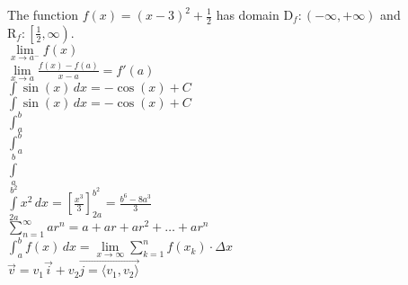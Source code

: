 \documentclass[11pt,letterpaper]{article}
\begin{document}
  The function $f(x) = (x-3)^2+\frac{1}{2}$ has domain $\mathrm{D}_f :(-\infty, +\infty)$ and $\mathrm{R}_f : \left[\frac{1}{2}, \infty\right)$.\\
  
  $\lim \limits_{x \to a^-} f(x)$\\
  
  $\displaystyle{\lim \limits_{x \to a} \frac{f(x)-f(a)}{x-a} = f'(a)}$\\
  
  $\int \sin(x) \, dx = -\cos(x) + C$\\
  
  $\displaystyle{\int \sin(x) \, dx = -\cos(x) + C}$\\

  $\int_a^b$\\
  
  $\displaystyle{\int_a^b}$\\
  
  $\int \limits_a^b$\\
  
  $\displaystyle{\int \limits_{2a}^{b^2} x^2 \, dx = \left[\frac{x^3}{3}\right]_{2a}^{b^2} = \frac{b^6 - 8a^3}{3}}$\\
  
  $\displaystyle{\sum \limits_{n=1}^{\infty}ar^n = a + ar + ar^2 + \dots + ar^n}$\\
  
  $\displaystyle{\int_a^b f(x) \, dx = \lim \limits_{x \to \infty} \sum \limits_{k=1}^n f(x_k) \cdot \Delta x}$\\
  
  $\vec{v} = v_1 \vec{i} + v_2 \vec{j = \langle   v_1, v_2 \rangle}$\\
\end{document}
